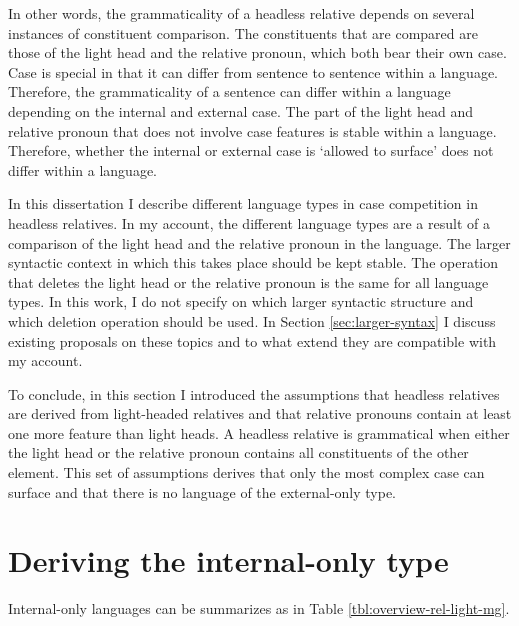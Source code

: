 In other words, the grammaticality of a headless relative depends on several instances of constituent comparison. The constituents that are compared are those of the light head and the relative pronoun, which both bear their own case. Case is special in that it can differ from sentence to sentence within a language. Therefore, the grammaticality of a sentence can differ within a language depending on the internal and external case. The part of the light head and relative pronoun that does not involve case features is stable within a language. Therefore, whether the internal or external case is `allowed to surface' does not differ within a language.

In this dissertation I describe different language types in case competition in headless relatives. In my account, the different language types are a result of a comparison of the light head and the relative pronoun in the language.
The larger syntactic context in which this takes place should be kept stable. The operation that deletes the light head or the relative pronoun is the same for all language types. In this work, I do not specify on which larger syntactic structure and which deletion operation should be used. In Section \ref{sec:larger-syntax} I discuss existing proposals on these topics and to what extend they are compatible with my account.

To conclude, in this section I introduced the assumptions that headless relatives are derived from light-headed relatives and that relative pronouns contain at least one more feature than light heads. A headless relative is grammatical when either the light head or the relative pronoun contains all constituents of the other element. This set of assumptions derives that only the most complex case can surface and that there is no language of the external-only type.



\section{Deriving the internal-only type}\label{sec:deriving-only-internal}

Internal-only languages can be summarizes as in Table \ref{tbl:overview-rel-light-mg}.

